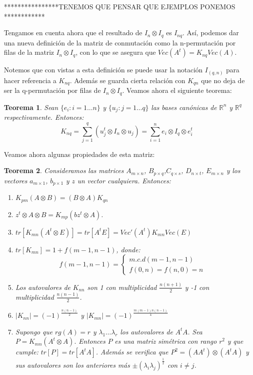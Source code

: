 \documentclass{article}
\theoremstyle{theorem-style}  %
\newtheorem{theorem}{Teorema}[section]  %
\theoremstyle{definition-style}
\theoremstyle{example-style}
\theoremstyle{exercise-style}
\begin{document}
	****************TENEMOS QUE PENSAR QUE EJEMPLOS PONEMOS ************
	
	Tengamos en cuenta ahora que el resultado de $I_n \otimes I_q$ es $I_{nq}$. Así, podemos dar una nueva definición de la matriz de conmutación como la n-permutación por filas de la matriz $I_n \otimes I_q$, con lo que se asegura que  $Vec(A^t)= K_{nq}Vec(A)$.
	
	Notemos que con vistas a esta definición se puede usar la notación $I_{(q,n)}$ para hacer referencia a $K_{nq}$. Además se guarda cierta relación con $K_{qn}$ que no deja de ser la q-permutación por filas de $I_n \otimes I_q$. Veamos ahora el siguiente teorema:
	
	\begin{theorem}
		Sean $\{e_i:i=1 \dots n\}$ y $\{u_j:j=1 \dots q\}$ las bases canónicas de $\mathbb{R}^n$ y $\mathbb{R}^q$ respectivamente. Entonces:
		$$ K_{nq}=\sum_{j=1}^{q} (u_j^t \otimes  I_n \otimes u_j) = \sum_{i=1}^{n} e_i \otimes I_q \otimes e_i^t$$
	\end{theorem}
	
	Veamos ahora algunas propiedades de esta matriz:
	
	\begin{theorem}
		Consideramos las matrices $A_{m \times n}$, $B_{p \times q}$,$C_{q \times s}$, $D_{n \times t}$, $E_{m \times n}$ y los vectores $a_{m \times 1}$, $b_{p \times 1}$ y $z$ un vector cualquiera. Entonces:
		
		\begin{enumerate}
			\item $K_{pm}(A \otimes B) = (B \otimes A) K_{qn}$
			\item $z^t \otimes A \otimes B = K_{mp}(bz^t \otimes A)$.
			\item $tr[K_{mn}(A^t \otimes E)]=tr[A^tE]= Vec'(A^t)K_{mn}Vec(E)$
			\item $tr[K_{mn}]=1+f(m-1,n-1)$, donde:
			$$f(m-1,n-1) = \begin{cases} m.c.d(m-1, n-1)\\ f(0,n)=f(n,0)=n \end{cases} $$
			\item Los autovalores de $K_{nn}$ son 1 con multiplicidad $\frac{n(n+1)}{2}$ y -1 con multiplicidad $\frac{n(n-1)}{2}$.
			\item $|K_{nn}|= (-1)^{\frac{n(n-1)}{2}}$ y $|K_{mn}|=(-1)^{\frac{m(m-1)n(n-1)}{4}}$
			
			\item Supongo que $rg(A)=r$ y $\lambda_1 \dots \lambda_r$ los autovalores de $A^tA$. Sea $P=K_{mn}(A^t \otimes A)$. Entonces $P$ es una matriz simétrica con rango $r^2$ y que cumple: $tr[P]= tr[A^tA]$. Además se verifica que $P^2=(AA^t)\otimes(A^tA)$ y sus autovalores son los anteriores más $\pm (\lambda_i \lambda_j)^\frac{1}{2}$ con $i \neq j$.
			
		\end{enumerate} 
	\end{theorem}
	
\end{document}
